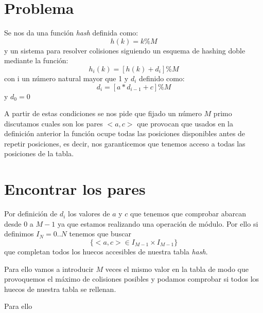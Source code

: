 \documentclass{article}
\begin{document}
\section{Problema}

Se nos da una función \textit{hash} definida como: $$ h(k) = k \% M $$
y un sistema para resolver colisiones siguiendo un esquema de hashing doble mediante la función:
$$ h_i(k) = [h(k) + d_i] \% M $$ con i un número natural mayor que 1 y $d_i$ definido como: $$d_i = [a*d_{i-1}+c] \% M $$ y $d_0 = 0$

A partir de estas condiciones se nos pide que fijado un número $M$
primo discutamos cuales son los pares $<a,c>$ que provocan que usados
en la definición anterior la función ocupe todas las posiciones
disponibles antes de repetir posiciones, es decir, nos garanticemos
que tenemos acceso a todas las posiciones de la tabla.

\section{Encontrar los pares}

Por definición de $d_i$ los valores de $a$ y $c$ que tenemos que
comprobar abarcan desde 0 a $M-1$ ya que estamos realizando una
operación de módulo. Por ello si definimos $I_N = {0..N}$ tenemos que buscar
$$\{<a,c> \in I_{M-1}\times I_{M-1}\}$$ que completan todos los huecos accesibles de nuestra
tabla \textit{hash}.

Para ello vamos a introducir $M$ veces el mismo valor en la tabla de
modo que provoquemos el máximo de colisiones posibles y podamos
comprobar si todos los huecos de nuestra tabla se rellenan.

Para ello 
\end{document}
